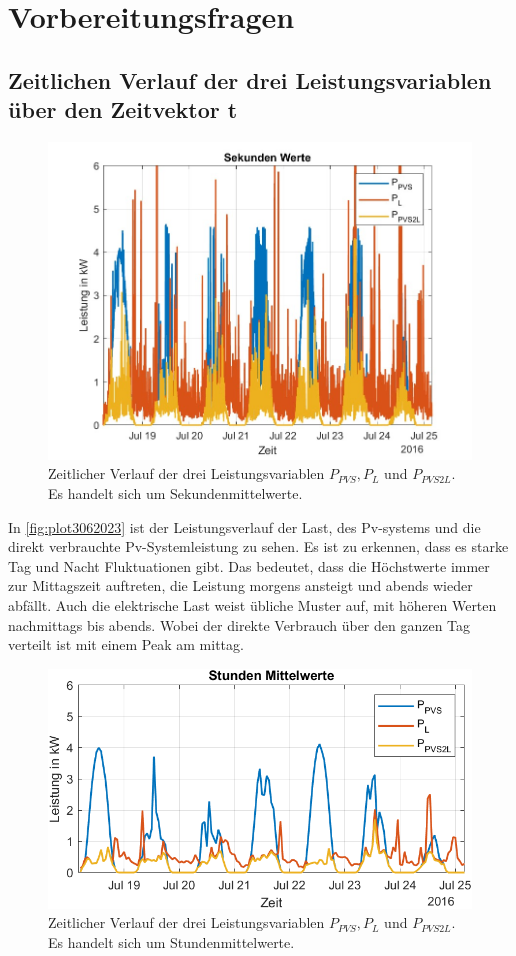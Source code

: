 \newpage
\section{Vorbereitungsfragen}
\subsection{Zeitlichen Verlauf der
drei Leistungsvariablen über den Zeitvektor t}
\begin{figure}[H]
    \centering
    \includegraphics[width=\textwidth]{Abbildungen/plot.jpg}
    \caption{Zeitlicher Verlauf der drei Leistungsvariablen $P_{PVS}, P_{L}$ und $P_{PVS2L}$. Es handelt sich um Sekundenmittelwerte.}
    \label{fig:plot3062023}
\end{figure}
In \autoref{fig:plot3062023} ist der Leistungsverlauf der Last, des Pv-systems und die direkt verbrauchte Pv-Systemleistung zu sehen. Es ist zu erkennen, dass es starke Tag und Nacht Fluktuationen gibt. 
Das bedeutet, dass die Höchstwerte immer zur Mittagszeit auftreten, die Leistung morgens ansteigt und abends wieder abfällt. Auch die elektrische Last weist übliche Muster auf, mit höheren Werten nachmittags bis abends. 
Wobei der direkte Verbrauch über den ganzen Tag verteilt ist mit einem Peak am mittag.
\begin{figure}[H]
    \centering
    \includegraphics[width=\textwidth]{Abbildungen/aufgabe1_plot2.png}
    \caption{Zeitlicher Verlauf der drei Leistungsvariablen $P_{PVS}, P_{L}$ und $P_{PVS2L}$. Es handelt sich um Stundenmittelwerte.}
    \label{fig:plot1_2_3062023}
\end{figure}
